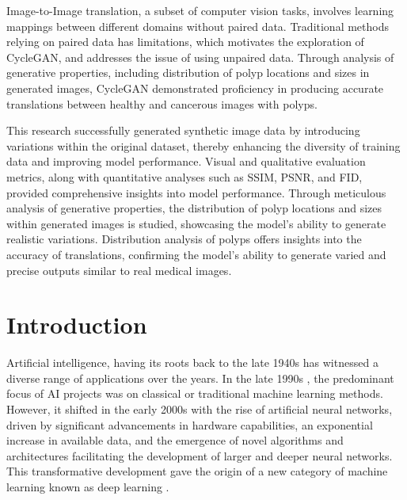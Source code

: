 \documentclass[UKenglish,12pt]{master-style}
\begin{document}
Image-to-Image translation, a subset of computer vision tasks, involves learning mappings between different domains without paired data. Traditional methods relying on paired data has limitations, which motivates the exploration of CycleGAN, and addresses the issue of using unpaired data. Through analysis of generative properties, including distribution of polyp locations and sizes in generated images, CycleGAN demonstrated proficiency in producing accurate translations between healthy and cancerous images with polyps. 

This research successfully generated synthetic image data by introducing variations within the original dataset, thereby enhancing the diversity of training data and improving model performance. Visual and qualitative evaluation metrics, along with quantitative analyses such as SSIM, PSNR, and FID, provided comprehensive insights into model performance. Through meticulous analysis of generative properties, the distribution of polyp locations and sizes within generated images is studied, showcasing the model's ability to generate realistic variations. Distribution analysis of polyps offers insights into the accuracy of translations, confirming the model's ability to generate varied and precise outputs similar to real medical images.





\tableofcontents
\listoffigures
\listoftables

\mainmatter
\chapter{Introduction}

Artificial intelligence, having its roots back to the late 1940s has witnessed a diverse range of applications over the years. In the late 1990s \cite{SHAO2022118221}, the predominant focus of AI projects was on classical or traditional machine learning methods. However, it shifted in the early 2000s with the rise of artificial neural networks, driven by significant advancements in hardware capabilities, an exponential increase in available data, and the emergence of novel algorithms and architectures facilitating the development of larger and deeper neural networks. This transformative development gave the origin of a new category of machine learning known as deep learning .
\end{document}
